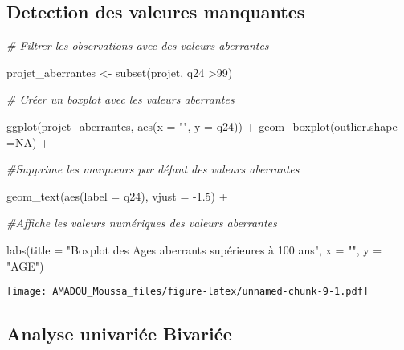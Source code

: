 \documentclass[
  14pt,
]{article}
\newenvironment{Shaded}{\begin{snugshade}}{\end{snugshade}}
\newcommand{\AttributeTok}[1]{\textcolor[rgb]{0.77,0.63,0.00}{#1}}
\newcommand{\CommentTok}[1]{\textcolor[rgb]{0.56,0.35,0.01}{\textit{#1}}}
\newcommand{\ConstantTok}[1]{\textcolor[rgb]{0.00,0.00,0.00}{#1}}
\newcommand{\DecValTok}[1]{\textcolor[rgb]{0.00,0.00,0.81}{#1}}
\newcommand{\FloatTok}[1]{\textcolor[rgb]{0.00,0.00,0.81}{#1}}
\newcommand{\FunctionTok}[1]{\textcolor[rgb]{0.00,0.00,0.00}{#1}}
\newcommand{\NormalTok}[1]{#1}
\newcommand{\OtherTok}[1]{\textcolor[rgb]{0.56,0.35,0.01}{#1}}
\newcommand{\SpecialCharTok}[1]{\textcolor[rgb]{0.00,0.00,0.00}{#1}}
\newcommand{\StringTok}[1]{\textcolor[rgb]{0.31,0.60,0.02}{#1}}
\begin{document}
\hypertarget{detection-des-valeures-manquantes}{%
\subsection{\texorpdfstring{\textbf{Detection des valeures
manquantes}~}{Detection des valeures manquantes~}}\label{detection-des-valeures-manquantes}}

\begin{Shaded}
\begin{Highlighting}[]
\CommentTok{\# Filtrer les observations avec des valeurs aberrantes}

\NormalTok{projet\_aberrantes }\OtherTok{\textless{}{-}} \FunctionTok{subset}\NormalTok{(projet, }
\NormalTok{                            q24 }\SpecialCharTok{\textgreater{}}\DecValTok{99}\NormalTok{)}

\CommentTok{\# Créer un boxplot avec les valeurs aberrantes}

\FunctionTok{ggplot}\NormalTok{(projet\_aberrantes, }
       \FunctionTok{aes}\NormalTok{(}\AttributeTok{x =} \StringTok{""}\NormalTok{,}
           \AttributeTok{y =}\NormalTok{ q24)) }\SpecialCharTok{+}
  \FunctionTok{geom\_boxplot}\NormalTok{(}\AttributeTok{outlier.shape =}\ConstantTok{NA}\NormalTok{) }\SpecialCharTok{+} 
  
\CommentTok{\#Supprime les marqueurs par défaut des valeurs aberrantes}
  
  \FunctionTok{geom\_text}\NormalTok{(}\FunctionTok{aes}\NormalTok{(}\AttributeTok{label =}\NormalTok{ q24),}
            \AttributeTok{vjust =} \SpecialCharTok{{-}}\FloatTok{1.5}\NormalTok{) }\SpecialCharTok{+} 
  
\CommentTok{\#Affiche les valeurs numériques des valeurs aberrantes}
  
  \FunctionTok{labs}\NormalTok{(}\AttributeTok{title =} \StringTok{"Boxplot des Ages aberrants supérieures à 100 ans"}\NormalTok{,}
       \AttributeTok{x =} \StringTok{""}\NormalTok{,}
       \AttributeTok{y =} \StringTok{"AGE"}\NormalTok{)}
\end{Highlighting}
\end{Shaded}

\texttt{[image: AMADOU\_Moussa\_files/figure-latex/unnamed-chunk-9-1.pdf]}

\hypertarget{analyse-univariuxe9e-bivariuxe9e}{%
\subsection{\texorpdfstring{\textbf{Analyse univariée Bivariée}\\
}{Analyse univariée Bivariée }}\label{analyse-univariuxe9e-bivariuxe9e}}
\end{document}
